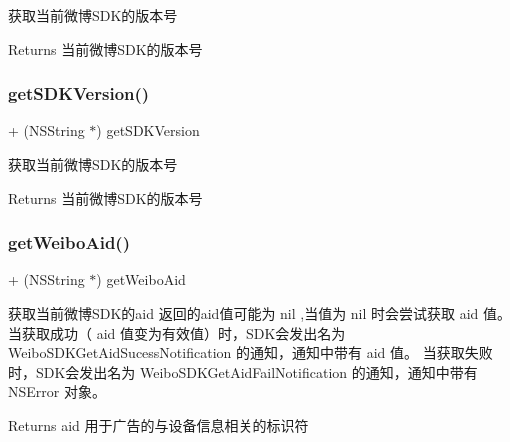 获取当前微博\+S\+D\+K的版本号 \begin{DoxyReturn}{Returns}
当前微博\+S\+D\+K的版本号 
\end{DoxyReturn}
\mbox{\label{interface_weibo_s_d_k_a691f8c3d5605163a7873eb0dbc754f79}} 
\subsubsection{\texorpdfstring{get\+S\+D\+K\+Version()}{getSDKVersion()}\hspace{0.1cm}{\footnotesize\ttfamily [3/3]}}
{\footnotesize\ttfamily + (N\+S\+String $\ast$) get\+S\+D\+K\+Version \begin{DoxyParamCaption}{ }\end{DoxyParamCaption}}

获取当前微博\+S\+D\+K的版本号 \begin{DoxyReturn}{Returns}
当前微博\+S\+D\+K的版本号 
\end{DoxyReturn}
\mbox{\label{interface_weibo_s_d_k_aec605d5ae27958199c450a8eda005298}} 
\subsubsection{\texorpdfstring{get\+Weibo\+Aid()}{getWeiboAid()}\hspace{0.1cm}{\footnotesize\ttfamily [1/3]}}
{\footnotesize\ttfamily + (N\+S\+String $\ast$) get\+Weibo\+Aid \begin{DoxyParamCaption}{ }\end{DoxyParamCaption}}

获取当前微博\+S\+D\+K的aid 返回的aid值可能为 nil ,当值为 nil 时会尝试获取 aid 值。 当获取成功（ aid 值变为有效值）时，\+S\+D\+K会发出名为 Weibo\+S\+D\+K\+Get\+Aid\+Sucess\+Notification 的通知，通知中带有 aid 值。 当获取失败时，\+S\+D\+K会发出名为 Weibo\+S\+D\+K\+Get\+Aid\+Fail\+Notification 的通知，通知中带有 N\+S\+Error 对象。 \begin{DoxyReturn}{Returns}
aid 用于广告的与设备信息相关的标识符 
\end{DoxyReturn}
\mbox{\label{interface_weibo_s_d_k_aec605d5ae27958199c450a8eda005298}} 
